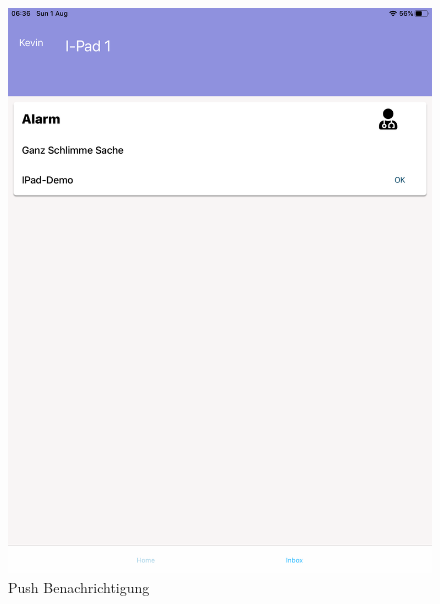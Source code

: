 \begin{figure}[h]
\begin{minipage}[b]{0.4\textwidth}
        \includegraphics[width=\textwidth]{graphics/screenshots/mobileclient/screenshots-inbox}
        \caption{Push Benachrichtigung}
    \end{minipage}
    \label{fig:MobileClient-Screens3}
\end{figure}

\clearpage

